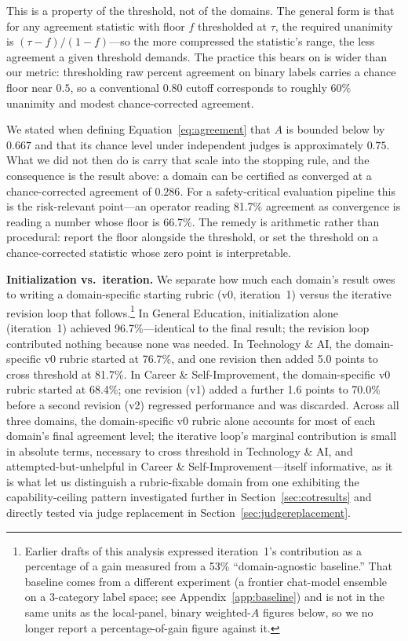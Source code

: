 \documentclass[11pt]{article}
\begin{document}
This is a property of the threshold, not of the domains. The general form
is that for any agreement statistic with floor $f$ thresholded at $\tau$,
the required unanimity is $(\tau - f)/(1 - f)$---so the more compressed
the statistic's range, the less agreement a given threshold demands. The
practice this bears on is wider than our metric: thresholding raw percent
agreement on binary labels carries a chance floor near $0.5$, so a
conventional $0.80$ cutoff corresponds to roughly 60\% unanimity and
modest chance-corrected agreement.

We stated when defining Equation~\ref{eq:agreement} that $A$ is bounded
below by $0.667$ and that its chance level under independent judges is
approximately $0.75$. What we did not then do is carry that scale into the
stopping rule, and the consequence is the result above: a domain can be
certified as converged at a chance-corrected agreement of $0.286$. For a
safety-critical evaluation pipeline this is the risk-relevant point---an
operator reading 81.7\% agreement as convergence is reading a number whose
floor is 66.7\%. The remedy is arithmetic rather than procedural: report
the floor alongside the threshold, or set the threshold on a
chance-corrected statistic whose zero point is interpretable.

\textbf{Initialization vs.\ iteration.} We separate how much each domain's
result owes to writing a domain-specific starting rubric (v0, iteration~1)
versus the iterative revision loop that follows.\footnote{Earlier drafts of
this analysis expressed iteration~1's contribution as a percentage of a
gain measured from a 53\% ``domain-agnostic baseline.'' That baseline comes
from a different experiment (a frontier chat-model ensemble on a
3-category label space; see Appendix~\ref{app:baseline}) and is not in the
same units as the local-panel, binary weighted-$A$ figures below, so we no
longer report a percentage-of-gain figure against it.} In General
Education, initialization alone (iteration~1) achieved 96.7\%---identical
to the final result; the revision loop contributed nothing because none
was needed. In Technology \& AI, the domain-specific v0 rubric started at
76.7\%, and one revision then added 5.0 points to cross threshold at
81.7\%. In Career \& Self-Improvement, the domain-specific v0 rubric
started at 68.4\%; one revision (v1) added a further 1.6 points to 70.0\%
before a second revision (v2) regressed performance and was discarded.
Across all three domains, the domain-specific v0 rubric alone accounts for
most of each domain's final agreement level; the iterative loop's marginal
contribution is small in absolute terms, necessary to cross threshold in
Technology \& AI, and attempted-but-unhelpful in Career \&
Self-Improvement---itself informative, as it is what let us distinguish a
rubric-fixable domain from one exhibiting the capability-ceiling pattern
investigated further in Section~\ref{sec:cotresults} and directly tested
via judge replacement in Section~\ref{sec:judgereplacement}.
\end{document}
